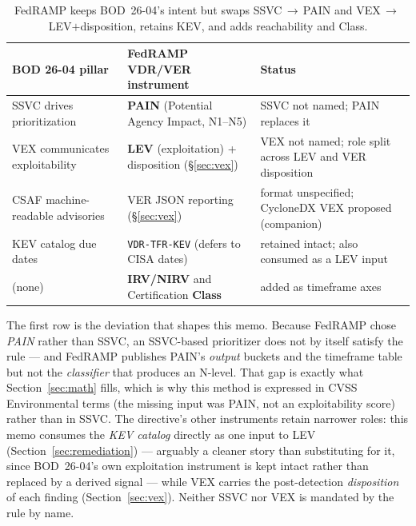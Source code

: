 \documentclass[11pt]{article}
\begin{document}
\begin{table}[H]
\centering
\renewcommand{\arraystretch}{1.25}
\footnotesize
\begin{tabular}{>{\raggedright\arraybackslash}p{} >{\raggedright\arraybackslash}p{} >{\raggedright\arraybackslash}p{}}
\toprule
\textbf{BOD 26-04 pillar} & \textbf{FedRAMP VDR/VER instrument} & \textbf{Status} \\
\midrule
SSVC drives prioritization & \textbf{PAIN} (Potential Agency Impact, N1--N5) & SSVC not named; PAIN replaces it \\
VEX communicates exploitability & \textbf{LEV} (exploitation) + disposition (\S\ref{sec:vex}) & VEX not named; role split across LEV and VER disposition \\
CSAF machine-readable advisories & VER JSON reporting (\S\ref{sec:vex}) & format unspecified; CycloneDX VEX proposed (companion) \\
KEV catalog due dates & \texttt{VDR-TFR-KEV} (defers to CISA dates) & retained intact; also consumed as a LEV input \\
(none) & \textbf{IRV/NIRV} and Certification \textbf{Class} & added as timeframe axes \\
\bottomrule
\end{tabular}
\caption{FedRAMP keeps BOD~26-04's intent but swaps SSVC$\,\rightarrow\,$PAIN and
VEX$\,\rightarrow\,$LEV${+}$disposition, retains KEV, and adds reachability and Class.}
\end{table}

The first row is the deviation that shapes this memo. Because FedRAMP chose
\emph{PAIN} rather than SSVC, an SSVC-based prioritizer does not by itself satisfy the
rule --- and FedRAMP publishes PAIN's \emph{output} buckets and the timeframe table
but not the \emph{classifier} that produces an N-level. That gap is exactly what
Section~\ref{sec:math} fills, which is why this method is expressed in CVSS
Environmental terms (the missing input was PAIN, not an exploitability score) rather
than in SSVC. The directive's other instruments retain narrower roles: this memo
consumes the \emph{KEV catalog} directly as one input to LEV
(Section~\ref{sec:remediation}) --- arguably a cleaner story than substituting for
it, since BOD~26-04's own exploitation instrument is kept intact rather than
replaced by a derived signal --- while VEX carries the post-detection
\emph{disposition} of each finding (Section~\ref{sec:vex}). Neither SSVC nor VEX is
mandated by the rule by name.
\end{document}
